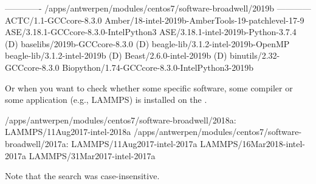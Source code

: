 \begin{prompt}
------------- /apps/antwerpen/modules/centos7/software-broadwell/2019b ------------
ACTC/1.1-GCCcore-8.3.0
Amber/18-intel-2019b-AmberTools-19-patchlevel-17-9
ASE/3.18.1-GCCcore-8.3.0-IntelPython3
ASE/3.18.1-intel-2019b-Python-3.7.4                             (D)
baselibs/2019b-GCCcore-8.3.0                                    (D)
beagle-lib/3.1.2-intel-2019b-OpenMP
beagle-lib/3.1.2-intel-2019b                                    (D)
Beast/2.6.0-intel-2019b                                         (D)
binutils/2.32-GCCcore-8.3.0
Biopython/1.74-GCCcore-8.3.0-IntelPython3-2019b
\end{prompt}

Or when you want to check whether some specific software, some compiler or some
application (e.g., LAMMPS) is installed on the \hpc.

\begin{prompt}
/apps/antwerpen/modules/centos7/software-broadwell/2018a:
LAMMPS/11Aug2017-intel-2018a
/apps/antwerpen/modules/centos7/software-broadwell/2017a:
LAMMPS/11Aug2017-intel-2017a
LAMMPS/16Mar2018-intel-2017a
LAMMPS/31Mar2017-intel-2017a
\end{prompt}

Note that the search was case-insensitive.
